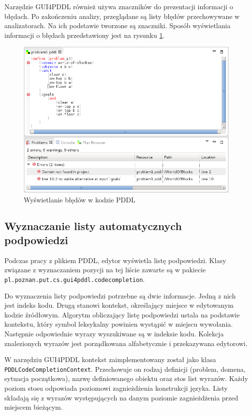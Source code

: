 Narzędzie GUI4PDDL również używa znaczników do prezentacji informacji o błędach. Po zakończeniu 
analizy, przeglądane są listy błędów przechowywane w analizatorach. Na ich podstawie tworzone
są znaczniki. Sposób wyświetlania informacji o błędach przedstawiony jest na rysunku \ref{ana_markers}.

\begin{figure}[h]
  \centering
    \includegraphics[scale=0.5]{img/ana_markers.png}
    \caption{Wyświetlanie błędów w kodzie PDDL}
    \label{ana_markers}
\end{figure}


\subsection{Wyznaczanie listy automatycznych podpowiedzi}
\begin{sloppypar}
Podczas pracy z plikiem PDDL, edytor wyświetla listę podpowiedzi. Klasy związane z wyznaczaniem
pozycji na tej liście zawarte są w pakiecie \texttt{pl.poznan.put.cs.gui4pddl.codecompletion}.
\end{sloppypar}

Do wyznaczenia listy podpowiedzi potrzebne są dwie informacje. Jedną z nich jest indeks kodu.
Drugą stanowi kontekst, określający miejsce w edytowanym kodzie źródłowym. Algorytm obliczający 
listę podpowiedzi ustala na podstawie kontekstu, który symbol leksykalny powinien wystąpić w miejscu 
wywołania. Następnie odpowiednie wyrazy wyszukiwane są w indeksie kodu. Kolekcja znalezionych 
wyrazów jest porządkowana alfabetycznie i przekazywana edytorowi.

W narzędziu GUI4PDDL kontekst zaimplementowany został jako klasa \texttt{PDDLCodeCompletionContext}.
Przechowuje on rodzaj definicji (problem, domena,
sytuacja początkowa), nazwę definiowanego obiektu oraz stos list wyrazów. Każdy poziom stosu odpowiada
poziomowi zagnieżdżenia konstrukcji języka. Listy składają się z wyrazów występujących na danym poziomie
zagnieżdżenia przed miejscem bieżącym.

